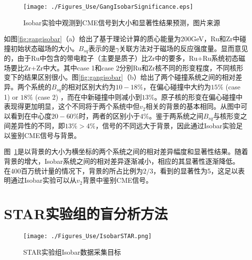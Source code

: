 \begin{figure}[ht]
\begin{center}
\texttt{[image: ./Figures\_Use/GangIsobarSignificance.eps]}
\end{center}
\caption{Isobar实验中观测到CME信号到大小和显著性结果预测，图片来源\cite{isobar1}}
\label{fig:gangsignificance}
\end{figure}
如图\ref{fig:gangisobar}（a）给出了基于理论计算的质心能量为200GeV，Ru和Zr中碰撞初始状态磁场的大小。$B_{sq}$表示的是$\gamma$关联方法对于磁场的反应强度量。显而意见的，由于Ru中包含的带电粒子（主要是质子）比Zr中的要多，Ru+Ru系统初态磁场要比Zr+Zr中大。其中case 1和case 2分别Ru和Zr核不同的形变程度，不同核形变下的结果区别很小。图\ref{fig:gangisobar}（b）给出了两个碰撞系统之间的相对差异。两个系统的$B_{sq}$的相对区别大约为$10-18\%$\cite{isobar1}，在偏心碰撞中大约为$15\%$ (case 1) or $18\%$ (case 2) ，而在中新碰撞中则减小到$13\%$。原子核的形变在偏心碰撞中表现得更加明显，这个不同将于两个系统中但$v_2$相关的背景的基本相同。从图中可以看到在中心度$20-60\%$时，两者的区别小于$4\%$。鉴于两系统之间$B_{sq}$与核形变之间差异性的不同，即$13\%>4\%$，信号的不同远大于背景，因此通过Isobar实验足以鉴别CME信号与背景。


图~\ref{fig:gangsignificance}是以背景的大小为横坐标的两个系统之间的相对差异幅度和显著性结果。随着背景的增大，Isobar系统之间的相对差异逐渐减小，相应的其显著性逐渐降低。
在400百万统计量的情况下，背景的所占比例为$2/3$，看到的显著性为5，这足以表明通过Isobar实验可以从$v_2$背景中鉴别CME信号。


\section{STAR实验组的盲分析方法}


\begin{figure}[htb]
\begin{center}
\texttt{[image: ./Figures\_Use/IsobarSTAR.png]}
\end{center}
\caption{STAR实验组Isobar数据采集目标}
\label{fig:signalVersusBackgrounds}
\end{figure}



